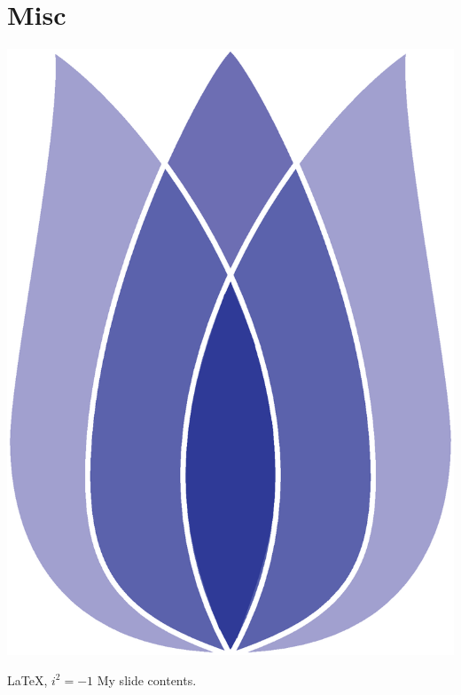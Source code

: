 \documentclass[
 size=12pt,
 paper=smartboard, %
 mode=present, %
 display=slides, %
style=tuliplab,
pauseslide,
fleqn,leqno]{powerdot}
\begin{document}
\section{Misc}

\begin{emptyslide}{}
\centering
{}
\includegraphics[height=0.8\slideheight]{logos/tulip-logo.eps}
\end{emptyslide}


\begin{slide}[toc=,bm={LaTeX, i*i=-1}]{\color{red}\LaTeX, $i^2=-1$}
My slide contents.
\end{slide}
\end{document}

